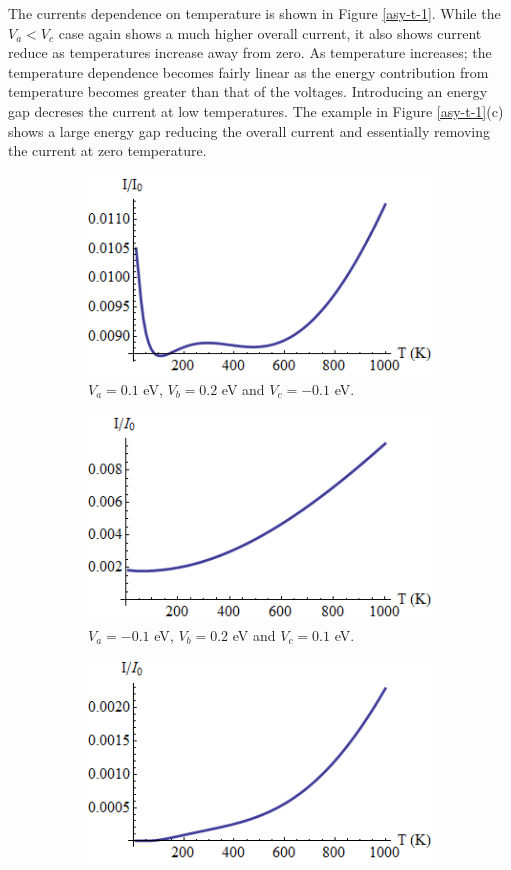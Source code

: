 		The currents dependence on temperature is shown in Figure \ref{asy-t-1}. While the $V_{a}<V_{c}$ case again shows a much higher overall current, it also shows current reduce as temperatures increase away from zero. As temperature increases; the temperature dependence becomes fairly linear as the energy contribution from temperature becomes greater than that of the voltages. Introducing an energy gap decreses the current at low temperatures. The example in Figure \ref{asy-t-1}(c) shows a large energy gap reducing the overall current and essentially removing the current at zero temperature.
		\begin{figure}[h]
			 \begin{subfigure}[h]{0.3\textwidth}
				\centerline{\includegraphics[scale=0.35]{images/asy-t-1}}
				\caption{$V_{a}=0.1$ eV, $V_{b}=0.2$ eV and $V_{c}=-0.1$ eV.}
			\end{subfigure}
			\hspace{0.5cm}
			\begin{subfigure}[h]{0.3\textwidth}
				\centerline{\includegraphics[scale=0.35]{images/asy-t-2}}
				\caption{$V_{a}=-0.1$ eV, $V_{b}=0.2$ eV and $V_{c}=0.1$ eV.}
			\end{subfigure}
			\hspace{0.5cm}
			\begin{subfigure}[h]{0.3\textwidth}
				\centerline{\includegraphics[scale=0.35]{images/asy-t-3}}

\end{subfigure}
\end{figure}
